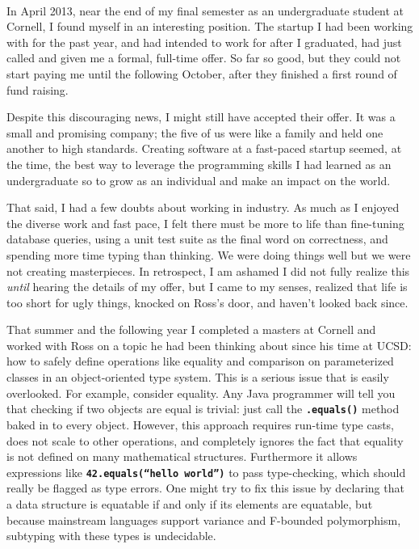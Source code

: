 \documentclass{article}
\newcommand{\mono}[1]{\textbf{\texttt{#1}}}
\renewcommand\maketitle{
{\flushleft{\textsf{%
Ben Greenman
\hfill
DRAFT: NSF Technical Background
}}\\
\hrulefill}
}
\begin{document}
\maketitle

In April 2013, near the end of my final semester as an undergraduate student at Cornell, I found myself in an interesting position.
The startup I had been working with for the past year, and had intended to work for after I graduated, had just called and given me a formal, full-time offer.
So far so good, but they could not start paying me until the following October, after they finished a first round of fund raising.

Despite this discouraging news, I might still have accepted their offer.
It was a small and promising company; the five of us were like a family and held one another to high standards.
Creating software at a fast-paced startup seemed, at the time, the best way to leverage the programming skills I had learned as an undergraduate so to grow as an individual and make an impact on the world.

That said, I had a few doubts about working in industry.
As much as I enjoyed the diverse work and fast pace, I felt there must be more to life than fine-tuning database queries, using a unit test suite as the final word on correctness, and spending more time typing than thinking.
We were doing things well but we were not creating masterpieces.
In retrospect, I am ashamed I did not fully realize this \emph{until} hearing the details of my offer, but I came to my senses, realized that life is too short for ugly things, knocked on Ross's door, and haven't looked back since.

\vspace{0.5cm}

That summer and the following year I completed a masters at Cornell and worked with Ross on a topic he had been thinking about since his time at UCSD: how to safely define operations like equality and comparison on parameterized classes in an object-oriented type system.
This is a serious issue that is easily overlooked.
For example, consider equality.
Any Java programmer will tell you that checking if two objects are equal is trivial: just call the \mono{.equals()} method baked in to every object.
However, this approach requires run-time type casts, does not scale to other operations, and completely ignores the fact that equality is not defined on many mathematical structures.
Furthermore it allows expressions like \mono{42.equals(``hello world'')} to pass type-checking, which should really be flagged as type errors.
One might try to fix this issue by declaring that a data structure is equatable if and only if its elements are equatable, but because mainstream languages support variance and F-bounded polymorphism, subtyping with these types is undecidable.
\end{document}

